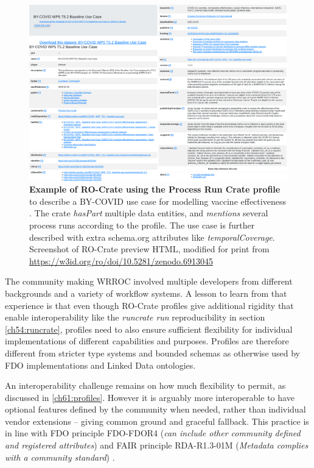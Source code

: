 \begin{landscape}
\begin{figure}[p]
  \includegraphics[height=\textheight]{figures/ch09/baseline-usecase.pdf}
  
    \caption[Example of RO-Crate using the Process Run Crate profile]{\footnotesize \textbf{Example of RO-Crate using the Process Run Crate profile} to
    describe a BY-COVID use case for modelling vaccine effectiveness \cite{Meurisse 2023}.
    The crate \emph{hasPart} multiple data entities, and \emph{mentions} several process runs according to the profile. The use case is further described with extra schema.org attributes like \emph{temporalCoverage}. Screenshot of RO-Crate preview HTML, modified for print from \url{https://w3id.org/ro/doi/10.5281/zenodo.6913045}
    }
  \label{ch61:fig:baseline-usecase}
\end{figure}
\end{landscape}

The community making WRROC involved multiple developers from different backgrounds and a variety of workflow systems. 
A lesson to learn from that experience is that even though RO-Crate profiles give additional rigidity that enable interoperability like the \emph{runcrate run} reproducibility in section \vref{ch54:runcrate}, profiles need to also ensure sufficient flexibility for individual implementations of different capabilities and purposes.
Profiles are therefore different from stricter type systems and bounded schemas as otherwise used by FDO implementations and Linked Data ontologies.

An interoperability challenge remains on how much flexibility to permit, as discussed in \vref{ch61:profiles}. However it is arguably more interoperable to have optional features defined by the community when needed, rather than individual vendor extensions -- giving common ground and graceful fallback. This practice is in line with FDO principle FDO-FDOR4 (\emph{can include other community defined and registered attributes}) \cite{Anders 2023} and FAIR principle RDA-R1.3-01M (\emph{Metadata complies with a community standard}) \cite{FAIR Maturity 2020}.



